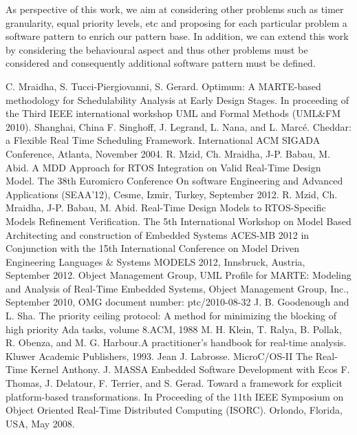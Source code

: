 \documentclass[runningheads,a4paper]{llncs}
\begin{document}
As perspective of this work, we aim at considering other problems such as timer granularity, equal priority levels, etc and proposing for each particular problem a software pattern to enrich our pattern base. In addition, we can extend this work by considering the behavioural aspect and thus other problems must be considered and consequently additional software pattern must be defined. 
\begin{thebibliography}{4}
 C. Mraidha, S. Tucci-Piergiovanni, S. Gerard. Optimum: A MARTE-based methodology for Schedulability Analysis at Early Design Stages. In proceeding of the Third IEEE international workshop UML and Formal Methods (UML\&FM 2010). Shanghai, China
F. Singhoff, J. Legrand, L. Nana, and L. Marcé. Cheddar: a Flexible Real Time Scheduling Framework. International ACM SIGADA Conference, Atlanta, November 2004. 
R. Mzid, Ch. Mraidha, J-P. Babau, M. Abid. A MDD Approach for RTOS Integration on Valid Real-Time Design Model. The 38th Euromicro Conference On software Engineering and Advanced Applications (SEAA’12), Cesme, Izmir, Turkey, September 2012. 
R. Mzid, Ch. Mraidha, J-P. Babau, M. Abid. Real-Time Design Models to RTOS-Specific Models Refinement Verification.  The 5th International Workshop on Model Based Architecting and construction of Embedded Systems ACES-MB 2012 in Conjunction with the 15th International Conference  on Model Driven Engineering Languages \& Systems MODELS 2012, Innsbruck, Austria, September 2012. 
Object Management Group, UML Profile for MARTE: Modeling and Analysis of Real-Time Embedded Systems, Object Management Group, Inc., September 2010, OMG document number: ptc/2010-08-32
 J. B. Goodenough and L. Sha. The priority ceiling protocol: A method for minimizing the blocking of high priority Ada tasks, volume 8.ACM, 1988
 M. H. Klein, T. Ralya, B. Pollak, R. Obenza, and M. G. Harbour.A practitioner’s handbook for real-time analysis. Kluwer Academic Publishers, 1993.
 Jean J. Labrosse. MicroC/OS-II The Real-Time Kernel 
 Anthony. J. MASSA Embedded Software Development with Ecos
 F. Thomas, J. Delatour, F. Terrier, and S. Gerad. Toward a framework for explicit platform-based transformations. In Proceeding of the 11th IEEE Symposium on Object Oriented Real-Time Distributed Computing (ISORC). Orlondo, Florida, USA, May 2008.

\end{thebibliography}
\end{document}
